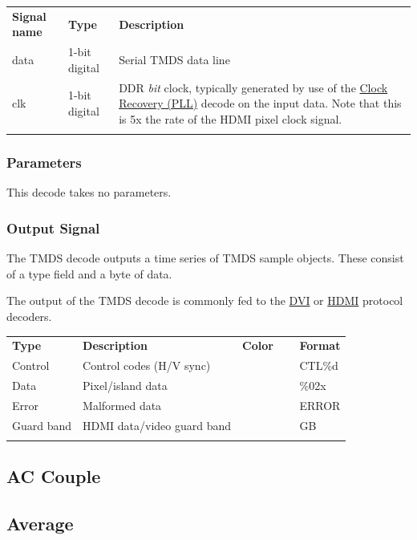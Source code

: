 \documentclass[11pt]{article}
\newcommand{\thickhline}{\Xhline{2.5\arrayrulewidth}}
\begin{document}
\begin{tabularx}{16cm}{llX}
\thickhline
\textbf{Signal name} & \textbf{Type} & \textbf{Description} \\
\thickhline
data & 1-bit digital & Serial TMDS data line \\
\thickhline
clk & 1-bit digital & DDR \emph{bit} clock, typically generated by use of the \hyperref[filter:cdrpll]{Clock Recovery
(PLL)} decode on the input data. Note that this is 5x the rate of the HDMI pixel clock signal. \\
\thickhline
\end{tabularx}

\subsubsection{Parameters}

This decode takes no parameters.

\subsubsection{Output Signal}

The TMDS decode outputs a time series of TMDS sample objects. These consist of a type field and a byte of data.

The output of the TMDS decode is commonly fed to the \hyperref[filter:dvi]{DVI} or \hyperref[filter:hdmi]{HDMI}
protocol decoders.

\begin{tabularx}{16cm}{lllX}
\thickhline
\textbf{Type} & \textbf{Description} & \textbf{Color} & \textbf{Format} \\
\thickhline
Control & Control codes (H/V sync) & \cellcolor{control}\textcolor{white}{Control} & CTL\%d \\
\thickhline
Data & Pixel/island data & \cellcolor{data}\textcolor{white}{Data} & \%02x \\
\thickhline
Error & Malformed data & \cellcolor{error}\textcolor{white}{Error} & ERROR \\
\thickhline
Guard band & HDMI data/video guard band & \cellcolor{preamble}\textcolor{white}{Preamble} & GB \\
\thickhline
\end{tabularx}

\subsection{AC Couple}
\subsection{Average}
\end{document}
